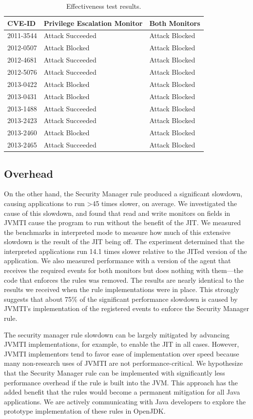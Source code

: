 \documentclass{sig-alternate}
\begin{document}
\begin{table}
\protect\caption{Effectiveness test results.}\label{tab:Exploit-experiment-summary}


\centering{}%
\begin{tabular}{l>{\raggedright}p{3cm}l}
\toprule 
\textbf{CVE-ID} & \textbf{Privilege Escalation Monitor} & \textbf{Both Monitors}\tabularnewline
\midrule
2011-3544 & Attack Succeeded  & Attack Blocked\tabularnewline
2012-0507 & Attack Blocked & Attack Blocked\tabularnewline
2012-4681 & Attack Succeeded  & Attack Blocked\tabularnewline
2012-5076 & Attack Succeeded  & Attack Blocked\tabularnewline
2013-0422 & Attack Blocked & Attack Blocked\tabularnewline
2013-0431 & Attack Blocked & Attack Blocked\tabularnewline
2013-1488 & Attack Succeeded  & Attack Blocked\tabularnewline
2013-2423 & Attack Succeeded  & Attack Blocked\tabularnewline
2013-2460 & Attack Blocked & Attack Blocked\tabularnewline
2013-2465 & Attack Succeeded  & Attack Blocked\tabularnewline
\bottomrule
\end{tabular}
\end{table}



\subsection{Overhead}\label{sub:Overhead}

On the other
hand, the Security Manager rule produced a significant slowdown, causing
applications to run >45 times slower, on average. We investigated
the cause of this slowdown, and found that read and write monitors
on fields in JVMTI cause the program to run without the benefit of
the JIT. We measured the benchmarks in interpreted mode to measure
how much of this extensive slowdown is the result of the JIT being
off. The experiment determined that the interpreted applications run
14.1 times slower relative to the JITed version of the application.
We also measured performance with a version of the agent that receives
the required events for both monitors but does nothing with them---the
code that enforces the rules was removed. The results are nearly identical
to the results we received when the rule implementations were in place.
This strongly suggests that about 75\% of the significant performance
slowdown is caused by JVMTI's implementation of the registered events
to enforce the Security Manager rule.

The security manager rule slowdown can be largely mitigated by advancing
JVMTI implementations, for example, to enable the JIT in all cases.
However, JVMTI implementors tend to favor ease of implementation over
speed because many non-research uses of JVMTI are not performance-critical.
We hypothesize that the Security Manager rule can be implemented with
significantly less performance overhead if the rule is built into
the JVM. This approach has the added benefit that the rules would
become a permanent mitigation for all Java applications. We are actively
communicating with Java developers to explore the prototype implementation
of these rules in OpenJDK.
\end{document}
